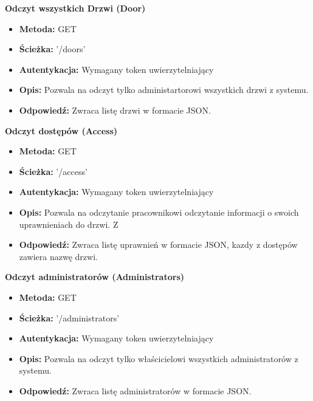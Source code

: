 \textbf{\large{Odczyt wszystkich Drzwi (Door)}}
\begin{itemize}
    \item \textbf{Metoda:} GET
    \item \textbf{Ścieżka:} '/doors'
    \item \textbf{Autentykacja:} Wymagany token uwierzytelniający
    \item \textbf{Opis:} Pozwala na odczyt tylko administartorowi wszystkich drzwi z systemu.
    \item \textbf{Odpowiedź:} Zwraca listę drzwi w formacie JSON.
\end{itemize}

\textbf{\large{Odczyt dostępów (Access)}}
\begin{itemize}
    \item \textbf{Metoda:} GET
    \item \textbf{Ścieżka:} '/access'
    \item \textbf{Autentykacja:} Wymagany token uwierzytelniający
    \item \textbf{Opis:} Pozwala na odczytanie pracownikowi odczytanie informacji o swoich uprawnieniach do drzwi. Z
    \item \textbf{Odpowiedź:} Zwraca listę uprawnień w formacie JSON, kazdy z dostępów zawiera nazwę drzwi.
\end{itemize}

\textbf{\large{Odczyt administratorów (Administrators)}}
\begin{itemize}
    \item \textbf{Metoda:} GET
    \item \textbf{Ścieżka:} '/administrators'
    \item \textbf{Autentykacja:} Wymagany token uwierzytelniający
    \item \textbf{Opis:} Pozwala na odczyt tylko właścicielowi wszystkich administratorów z systemu.
    \item \textbf{Odpowiedź:} Zwraca listę administratorów w formacie JSON.
\end{itemize}


